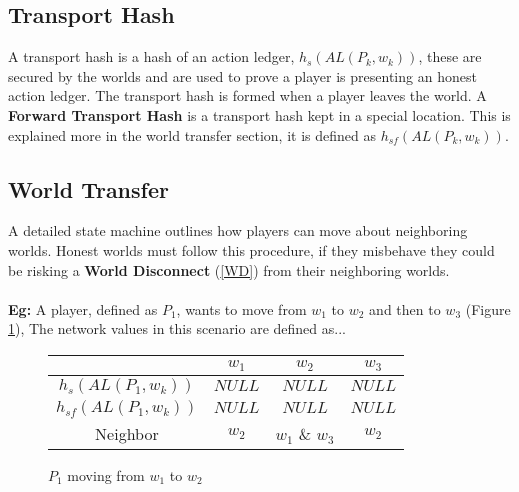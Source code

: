 \documentclass[runningheads,a4paper]{llncs}
\begin{document}
\subsection{Transport Hash}
\label{TH}
A transport hash is a hash of an action ledger, $h_s(AL(P_{k}, w_k))$, these are secured by the worlds and are used to prove a player is presenting an honest action ledger. The transport hash is formed when a player leaves the world. A \textbf{Forward Transport Hash} is a transport hash kept in a special location. This is explained more in the world transfer section, it is defined as  $h_{sf}(AL(P_{k}, w_k))$.

\subsection{World Transfer} 
\label{WT}
A detailed state machine outlines how players can move about neighboring worlds. Honest worlds must follow this procedure, if they misbehave they could be risking a \textbf{World Disconnect} (\ref{WD}) from their neighboring worlds. 
\\
\\
\textbf{Eg:} A player, defined as $P_1$, wants to move from $w_1$ to $w_2$ and then to $w_3$ (Figure \ref{w1tow2}), The network values in this scenario are defined as...

\begin{figure}
\caption{$P_1$ moving from $w_1$ to $w_2$}
\label{w1tow2}
\begin{center}
\end{center}
\begin{center}
\begin{tabular}{ c|c c c }
& $w_1$ & $w_2$ & $w_3$ \\
\hline 
$h_s(AL(P_1,w_k))$ & $NULL$ & $NULL$ & $NULL$ \\ 
$h_{sf}(AL(P_1,w_k))$ & $NULL$ & $NULL$ & $NULL$ \\ 
Neighbor & $w_2$ & $w_1$ \& $w_3$ & $w_2$\\
\end{tabular}
\end{center}
\end{figure}
\end{document}
